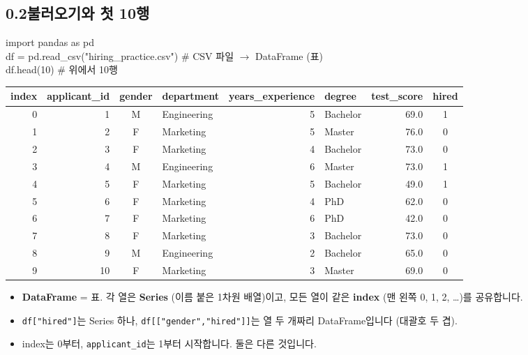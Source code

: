 \documentclass[11pt,a4paper]{article}
\newcommand{\code}[1]{\texttt{#1}}
\begin{document}
\subsection*{0.2\quad 불러오기와 첫 10행}
\begin{codebox}
import pandas as pd\\
df = pd.read\_csv("hiring\_practice.csv") \hfill \# CSV 파일 $\to$ DataFrame (표)\\
df.head(10) \hfill \# 위에서 10행
\end{codebox}
\begin{center}\small
\begin{tabular}{@{}r r c l r l r c@{}}
\toprule
index & applicant\_id & gender & department & years\_experience & degree & test\_score & hired \\
\midrule
0 & 1 & M & Engineering & 5 & Bachelor & 69.0 & 1 \\
1 & 2 & F & Marketing & 5 & Master & 76.0 & 0 \\
2 & 3 & F & Marketing & 4 & Bachelor & 73.0 & 0 \\
3 & 4 & M & Engineering & 6 & Master & 73.0 & 1 \\
4 & 5 & F & Marketing & 5 & Bachelor & 49.0 & 1 \\
5 & 6 & F & Marketing & 4 & PhD & 62.0 & 0 \\
6 & 7 & F & Marketing & 6 & PhD & 42.0 & 0 \\
7 & 8 & F & Marketing & 3 & Bachelor & 73.0 & 0 \\
8 & 9 & M & Engineering & 2 & Bachelor & 65.0 & 0 \\
9 & 10 & F & Marketing & 3 & Master & 69.0 & 0 \\
\bottomrule
\end{tabular}
\end{center}
\begin{itemize}
\item \textbf{DataFrame} = 표. 각 열은 \textbf{Series} (이름 붙은 1차원 배열)이고, 모든 열이 같은 \textbf{index} (맨 왼쪽 0, 1, 2, \dots)를 공유합니다.
\item \code{df["hired"]}는 Series 하나, \code{df[["gender","hired"]]}는 열 두 개짜리 DataFrame입니다 (대괄호 두 겹).
\item index는 0부터, \code{applicant\_id}는 1부터 시작합니다. 둘은 다른 것입니다.
\end{itemize}
\end{document}
